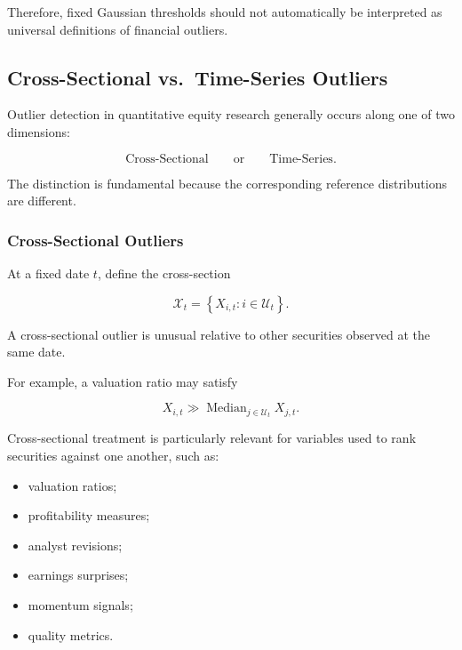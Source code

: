 \documentclass[11pt,a4paper]{article}
\begin{document}
Therefore, fixed Gaussian thresholds should not automatically be interpreted as
universal definitions of financial outliers.


\subsection{Cross-Sectional vs.\ Time-Series Outliers}
\label{subsec:cross_sectional_time_series_outliers}

Outlier detection in quantitative equity research generally occurs along one
of two dimensions:

\begin{equation}
\boxed{
\text{Cross-Sectional}
\qquad\text{or}\qquad
\text{Time-Series}.
}
\end{equation}

The distinction is fundamental because the corresponding reference
distributions are different.


\subsubsection{Cross-Sectional Outliers}

At a fixed date $t$, define the cross-section

\begin{equation}
\mathcal{X}_t
=
\left\{
X_{i,t}
:
i\in\mathcal{U}_t
\right\}.
\end{equation}

A cross-sectional outlier is unusual relative to other securities observed at
the same date.

For example, a valuation ratio may satisfy

\begin{equation}
X_{i,t}
\gg
\operatorname{Median}_{j\in\mathcal{U}_t}
X_{j,t}.
\end{equation}

Cross-sectional treatment is particularly relevant for variables used to rank
securities against one another, such as:

\begin{itemize}
    \item valuation ratios;
    \item profitability measures;
    \item analyst revisions;
    \item earnings surprises;
    \item momentum signals;
    \item quality metrics.
\end{itemize}
\end{document}

